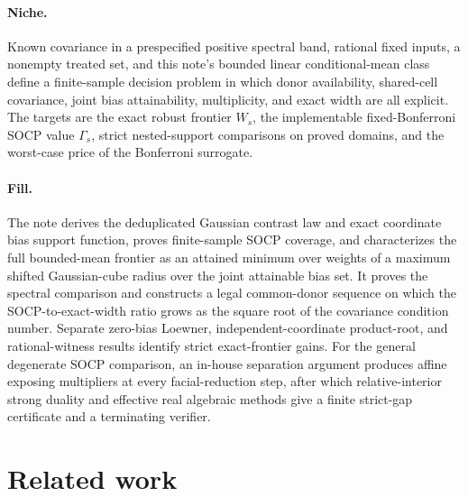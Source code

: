 \documentclass{article}
\begin{document}
\paragraph{Niche.} Known covariance in a prespecified positive spectral band, rational fixed inputs, a nonempty treated set, and this note's bounded linear conditional-mean class define a finite-sample decision problem in which donor availability, shared-cell covariance, joint bias attainability, multiplicity, and exact width are all explicit. The targets are the exact robust frontier \(W_s\), the implementable fixed-Bonferroni SOCP value \(\Gamma_s\), strict nested-support comparisons on proved domains, and the worst-case price of the Bonferroni surrogate.

\paragraph{Fill.} The note derives the deduplicated Gaussian contrast law and exact coordinate bias support function, proves finite-sample SOCP coverage, and characterizes the full bounded-mean frontier as an attained minimum over weights of a maximum shifted Gaussian-cube radius over the joint attainable bias set. It proves the spectral comparison and constructs a legal common-donor sequence on which the SOCP-to-exact-width ratio grows as the square root of the covariance condition number. Separate zero-bias Loewner, independent-coordinate product-root, and rational-witness results identify strict exact-frontier gains. For the general degenerate SOCP comparison, an in-house separation argument produces affine exposing multipliers at every facial-reduction step, after which relative-interior strong duality and effective real algebraic methods give a finite strict-gap certificate and a terminating verifier.

\section{Related work}
\end{document}
